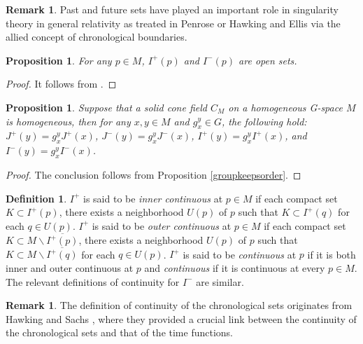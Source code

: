 \documentclass[a4paper,11pt]{article}
\theoremstyle{plain}
\newtheorem{prop}[thm]{Proposition}
\theoremstyle{definition}
\newtheorem{defn}[thm]{Definition}
\newtheorem{rmk}[thm]{Remark}
\numberwithin{equation}{section}
\begin{document}
\begin{rmk}
	Past and future sets have played an important role in singularity theory in general relativity as treated in Penrose \cite{Penrose72} or Hawking and Ellis \cite{Hawkingandellis73} via the allied concept of chronological boundaries. 
\end{rmk}


\begin{prop}\label{openness}
	For any $p\in M$, $I^{+}(p)$ and $I^-(p)$ are open sets.
\end{prop}	

\begin{proof}
	It follows from \cite[Proposition 2.8]{NW25}.
\end{proof}


\begin{prop}\label{homogeneous-prop}
	Suppose that a solid cone field $C_M$ on a homogeneous G-space $M$ is homogeneous, then for any $x,y\in M$ and $g_{x}^{y}\in G$, the following hold: $J^{+}(y)=g_{x}^{y}J^{+}(x)$, $J^{-}(y)=g_{x}^{y}J^{-}(x)$, $I^{+}(y)=g_{x}^{y}I^{+}(x)$, and $I^{-}(y)=g_{x}^{y}I^{-}(x)$.
\end{prop}
\begin{proof}
	The conclusion follows from Proposition \ref{groupkeepsorder}.
\end{proof}


\begin{defn}\label{continuity-for-chronological sets}
$I^+$ is said to be \textit{inner continuous} at $p\in M$ if each compact set $K\subset I^+(p)$, there exists a neighborhood $U(p)$ of $p$ such that $K\subset I^+(q)$ for each $q\in U(p)$.
$I^+$ is said to be \textit{outer continuous} at $p\in M$ if each compact set $K\subset M\backslash \overline{I^+(p)}$, there exists a neighborhood $U(p)$ of $p$ such that $K\subset M\backslash \overline{I^+(q)}$ for each $q\in U(p)$. $I^+$ is said to be \textit{continuous} at $p$ if it is both inner and outer continuous at $p$ and \textit{continuous} if it is continuous at every $p\in M$.
The relevant definitions of continuity for $I^-$ are similar.
\end{defn}


\begin{rmk}
	The definition of continuity of the chronological sets originates from Hawking and Sachs \cite[Section 1.6]{Hawkingandsachs74}, where they provided a crucial link between the continuity of the chronological sets and that of the time functions.
\end{rmk}
\end{document}
